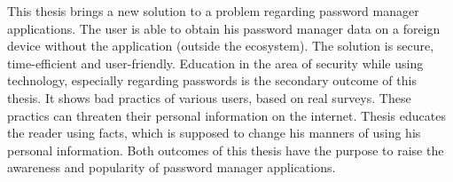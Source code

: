 This thesis brings a new solution to a problem regarding password manager applications. The user is able to obtain his password manager data on a foreign device without the application (outside the ecosystem). The solution is secure, time-efficient and user-friendly. Education in the area of security while using technology, especially regarding passwords is the secondary outcome of this thesis. It shows bad practics of various users, based on real surveys. These practics can threaten their personal information on the internet. Thesis educates the reader using facts, which is supposed to change his manners of using his personal information. Both outcomes of this thesis have the purpose to raise the awareness and popularity of password manager applications.